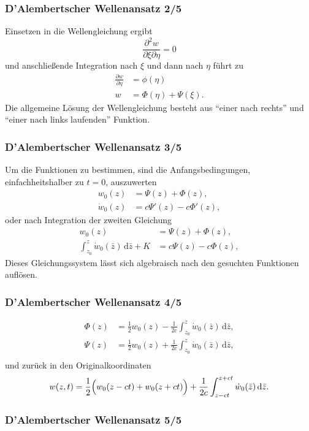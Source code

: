 \begin{frame}
\frametitle{D'Alembertscher Wellenansatz 2/5}
Einsetzen in die Wellengleichung ergibt
\begin{equation*}
 \frac{\partial^2 w}{\partial \xi \partial \eta}=0
\end{equation*}
und anschließende Integration nach $\xi$ und dann nach $\eta$ führt zu
\begin{align*}
 \frac{\partial w}{\partial \eta} &= \phi(\eta) \\
 w&=\Phi(\eta) + \Psi(\xi).
\end{align*}
Die allgemeine Lösung der Wellengleichung besteht aus ``einer nach rechts'' und ``einer nach links laufenden'' Funktion. 
\end{frame}

\begin{frame}
\frametitle{D'Alembertscher Wellenansatz 3/5}
Um die Funktionen zu bestimmen, sind die Anfangsbedingungen, einfachheitshalber zu $t=0$, auszuwerten
\begin{align*}
 w_0(z)&=\Psi(z)+\Phi(z),\\
 \dot{w}_0(z)&=c\Psi'(z)-c\Phi'(z),
\end{align*}
oder nach Integration der zweiten Gleichung
\begin{align*}
 w_0(z)&=\Psi(z)+\Phi(z),\\
 \int_{z_0}^z  \dot{w}_0(\bar{z})\,\mathrm{d}\bar{z}+K&=c\Psi(z)-c\Phi(z),
\end{align*}
Dieses Gleichungssystem lässt sich algebraisch nach den gesuchten Funktionen auflösen.
\end{frame}

\begin{frame}
\frametitle{D'Alembertscher Wellenansatz 4/5}
\begin{align*}
 \Phi(z)&=\frac{1}{2}w_0(z)-\frac{1}{2c} \int_{z_0}^z  \dot{w}_0(\bar{z})\,\mathrm{d}\bar{z},\\
 \Psi(z)&=\frac{1}{2}w_0(z)+\frac{1}{2c} \int_{z_0}^z  \dot{w}_0(\bar{z})\,\mathrm{d}\bar{z},\\
\end{align*}
und zurück in den Originalkoordinaten
\begin{equation*}
 w(z,t)=\frac{1}{2}\Bigl( w_0(z-ct) + w_0(z+ct) \Bigr)+\frac{1}{2c} \int_{z-ct}^{z+ct}  \dot{w}_0(\bar{z})\,\mathrm{d}\bar{z}.
\end{equation*}
\end{frame}

\begin{frame}
\frametitle{D'Alembertscher Wellenansatz 5/5}



\end{frame}

